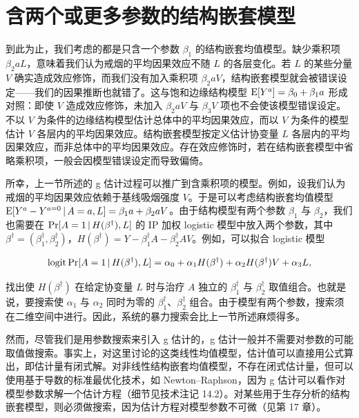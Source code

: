 \section{含两个或更多参数的结构嵌套模型}

到此为止，我们考虑的都是只含一个参数 $\beta_1$ 的结构嵌套均值模型。缺少乘积项 $\beta_2aL$，意味着我们认为戒烟的平均因果效应不随 $L$ 的各层变化。若 $L$ 的某些分量 $V$ 确实造成效应修饰，而我们没有加入乘积项 $\beta_2aV$，结构嵌套模型就会被错误设定——我们的因果推断也就错了。这与饱和边缘结构模型 $\mathrm{E}[Y^a]=\beta_0+\beta_1a$ 形成对照：即使 $V$ 造成效应修饰，未加入 $\beta_2aV$ 与 $\beta_3V$ 项也不会使该模型错误设定。不以 $V$ 为条件的边缘结构模型估计总体中的平均因果效应，而以 $V$ 为条件的模型估计 $V$ 各层内的平均因果效应。结构嵌套模型按定义估计协变量 $L$ 各层内的平均因果效应，而非总体中的平均因果效应。存在效应修饰时，若在结构嵌套模型中省略乘积项，一般会因模型错误设定而导致偏倚。

所幸，上一节所述的 g 估计过程可以推广到含乘积项的模型。例如，设我们认为戒烟的平均因果效应依赖于基线吸烟强度 $V$。于是可以考虑结构嵌套均值模型 $\mathrm{E}[Y^a-Y^{a=0}\,|\, A=a,L]=\beta_1a+\beta_2aV$。由于结构模型有两个参数 $\beta_1$ 与 $\beta_2$，我们也需要在 $\Pr[A=1\,|\, H(\beta^\dagger),L]$ 的 IP 加权 logistic 模型中放入两个参数，其中 $\beta^\dagger=(\beta_1^\dagger,\beta_2^\dagger)$，$H(\beta^\dagger)=Y-\beta_1^\dagger A-\beta_2^\dagger AV$。例如，可以拟合 logistic 模型

\[
\operatorname{logit}\Pr[A=1\,|\, H(\beta^\dagger),L]=\alpha_0+\alpha_1H(\beta^\dagger)+\alpha_2H(\beta^\dagger)V+\alpha_3L,
\]

找出使 $H(\beta^\dagger)$ 在给定协变量 $L$ 时与治疗 $A$ 独立的 $\beta_1^\dagger$ 与 $\beta_2^\dagger$ 取值组合。也就是说，要搜索使 $\alpha_1$ 与 $\alpha_2$ 同时为零的 $\beta_1^\dagger$、$\beta_2^\dagger$ 组合。由于模型有两个参数，搜索须在二维空间中进行。因此，系统的暴力搜索会比上一节所述麻烦得多。


然而，尽管我们是用参数搜索来引入 g 估计的，g 估计一般并不需要对参数的可能取值做搜索。事实上，对这里讨论的这类线性均值模型，估计值可以直接用公式算出，即估计量有闭式解。对非线性结构嵌套均值模型，不存在闭式估计量，但可以使用基于导数的标准最优化技术，如 Newton--Raphson，因为 g 估计可以看作对模型参数求解一个估计方程（细节见技术注记 14.2）。对某些用于生存分析的结构嵌套模型，则必须做搜索，因为估计方程对模型参数不可微（见第 17 章）。

